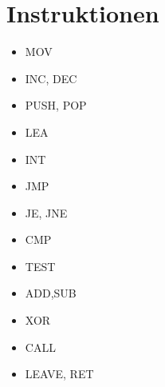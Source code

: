 \section{Instruktionen}

\begin{itemize}
\item MOV
\item INC, DEC
\item PUSH, POP
\item LEA
\item INT
\item JMP
\item JE, JNE
\item CMP
\item TEST
\item ADD,SUB
\item XOR
\item CALL
\item LEAVE, RET
\end{itemize}
